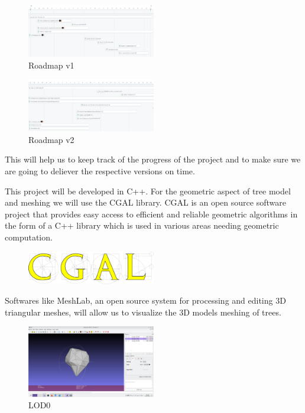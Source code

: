 \documentclass[12pt]{article}
\begin{document}
\begin{figure}[H]
    \centering
    \includegraphics[width=0.5\textwidth]{images/roadmap_v1.png}
    \caption{Roadmap v1}
\end{figure}

\begin{figure}[H]
    \centering
    \includegraphics[width=0.5\textwidth]{images/roadmap_v2.png}
    \caption{Roadmap v2}
\end{figure}

This will help us to keep track of the progress of the project and to make sure
we are going to deliever the respective versions on time.

This project will be developed in C++.
For the geometric aspect of tree model and meshing we will use the CGAL library.
CGAL is an open source software project that provides easy access to efficient
and reliable geometric algorithms in the form of a C++ library which is used
in various areas needing geometric computation.

\begin{figure}[H]
    \vspace{1.5cm}
    \centering
    \includegraphics[width=0.5\textwidth]{images/cgal_logo.png}
\end{figure}

Softwares like MeshLab, an open source system for processing and editing 3D
triangular meshes, will allow us to visualize the 3D models meshing of trees.

\begin{figure}[H]
    \vspace{1.5cm}
    \centering
    \includegraphics[width=0.5\textwidth]{images/LOD0.png}
    \caption{LOD0}
\end{figure}
\end{document}
